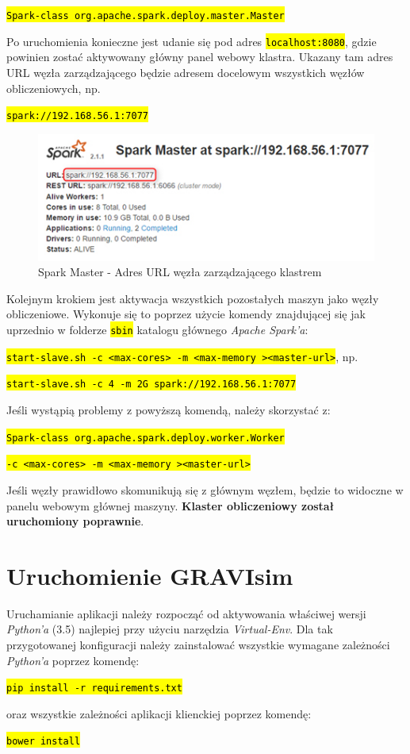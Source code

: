\documentclass[a4paper,onecolumn,oneside,12pt]{memoir}
\begin{document}
{{\centerline{\texttt{\hl{Spark-class org.apache.spark.deploy.master.Master}}}
\vspace{2mm}Po uruchomienia konieczne jest udanie się pod adres \texttt{\hl{localhost:8080}}, gdzie powinien zostać aktywowany główny panel webowy klastra. Ukazany tam adres URL węzła zarządzającego będzie adresem
docelowym wszystkich węzłów obliczeniowych, np.\vspace{2mm}
\centerline{\texttt{\hl{spark://192.168.56.1:7077}}}
\begin{figure}[h]
	\centering
	\includegraphics[width=1\linewidth]{spark-working}
	\caption{Spark Master - Adres URL węzła zarządzającego klastrem}
	\label{fig:stronaTytulowa}
\end{figure}

Kolejnym krokiem jest aktywacja wszystkich pozostałych maszyn jako węzły obliczeniowe. Wykonuje się to poprzez użycie komendy znajdującej się jak uprzednio w folderze \texttt{\hl{sbin}} katalogu głównego \textit{Apache Spark'a}: \\ \vspace{2mm}
\centerline{\texttt{\hl{start-slave.sh -c <max-cores> -m <max-memory ><master-url>}}, np.}
\centerline{\texttt{\hl{start-slave.sh -c 4 -m 2G spark://192.168.56.1:7077}}}
Jeśli wystąpią problemy z powyższą komendą, należy skorzystać z:\\
\centerline{\texttt{\hl{Spark-class org.apache.spark.deploy.worker.Worker }}}
\centerline{\texttt{\hl{-c <max-cores> -m <max-memory ><master-url>}}}
Jeśli węzły prawidłowo skomunikują się z głównym węzłem, będzie to widoczne
w panelu webowym głównej maszyny. \textbf{Klaster obliczeniowy został uruchomiony poprawnie}.
\pagebreak
\vspace*{1mm}
\section{Uruchomienie GRAVIsim}
Uruchamianie aplikacji należy rozpocząć od aktywowania właściwej wersji \textit{Python'a} (3.5)
najlepiej przy użyciu narzędzia \textit{Virtual-Env}. Dla tak przygotowanej konfiguracji
należy zainstalować wszystkie wymagane zależności \textit{Python'a} poprzez komendę:\vspace{2mm}
\centerline{\texttt{\hl{pip install -r requirements.txt}}}\vspace{2mm}
oraz wszystkie zależności aplikacji klienckiej poprzez komendę:\\\vspace{2mm}
\centerline{\texttt{\hl{bower install}}}\vspace{2mm}

}}
\end{document}
